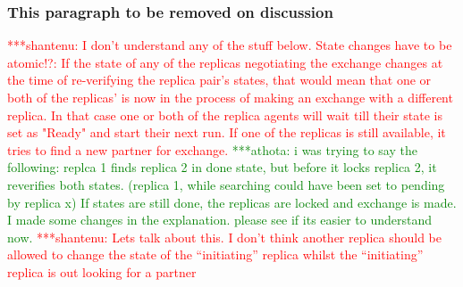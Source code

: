 \documentclass{rspublic}
\newcommand{\jhanote}[1]{ {\textcolor{red} { ***shantenu: #1 }}}
\newcommand{\athotanote}[1]{ {\textcolor{green} { ***athota: #1 }}}
\newcommand{\athotanote}[1]{}
\newcommand{\jhanote}[1]{}
\begin{document}

\subsubsection*{This paragraph to be removed on discussion}



\jhanote{I don't understand any of the stuff below. State changes have
  to be atomic!?: If the state of any of the replicas negotiating the
  exchange changes at the time of re-verifying the replica pair's
  states, that would mean that one or both of the replicas' is now in
  the process of making an exchange with a different replica. In that
  case one or both of the replica agents will wait till their state is
  set as "Ready" and start their next run. If one of the replicas is
  still available, it tries to find a new partner for exchange.}
\athotanote{i was trying to say the following: replca 1 finds replica
  2 in done state, but before it locks replica 2, it reverifies both
  states. (replica 1, while searching could have been set to pending
  by replica x) If states are still done, the replicas are locked and
  exchange is made. I made some changes in the explanation. please see
  if its easier to understand now.}\jhanote{Lets talk about this. I
  don't think another replica should be allowed to change the state
  of the ``initiating'' replica whilst the ``initiating'' replica
  is out looking for a partner}
\end{document}
